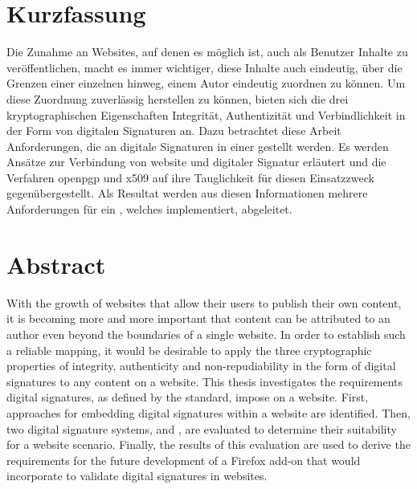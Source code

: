 

\noindent
\begin{minipage}{\textwidth}
\chapter*{Kurzfassung}
Die Zunahme an Websites, auf denen es möglich ist, auch als Benutzer Inhalte zu veröffentlichen, macht es immer wichtiger, diese Inhalte auch eindeutig, über
die Grenzen einer einzelnen  hinweg, einem Autor eindeutig zuordnen zu können. Um diese Zuordnung zuverlässig herstellen zu können, bieten
sich die drei kryptographischen Eigenschaften Integrität, Authentizität und Verbindlichkeit in der Form von digitalen Signaturen an. Dazu betrachtet diese
Arbeit Anforderungen, die an digitale Signaturen in einer  gestellt werden. Es werden Ansätze zur Verbindung von \gls{website} und digitaler
Signatur erläutert und die Verfahren \gls{openpgp} und \gls{x509} auf ihre Tauglichkeit für diesen Einsatzzweck gegenübergestellt. Als Resultat werden aus
diesen Informationen mehrere Anforderungen für ein , welches  implementiert, abgeleitet.

\chapter*{Abstract}
With the growth of websites that allow their users to publish their own content, it is becoming more and more important that content can be attributed to an
author even beyond the boundaries of a single website. In order to establish such a reliable mapping, it would be desirable to apply the three cryptographic
properties of integrity, authenticity and non-repudiability in the form of digital signatures to any content on a website. This thesis investigates the
requirements digital signatures, as defined by the  standard, impose on a website. First, approaches for embedding digital signatures within a
website are identified. Then, two digital signature systems,  and , are evaluated to determine their suitability for a website
scenario. Finally, the results of this evaluation are used to derive the requirements for the future development of a Firefox add-on that would incorporate
 to validate digital signatures in websites.

\end{minipage}
